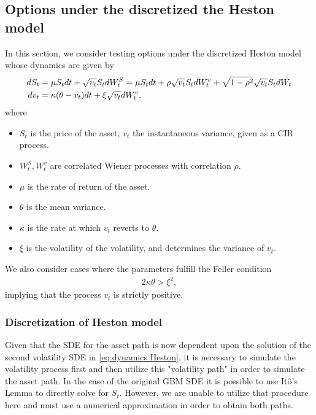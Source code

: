 \subsection{Options under the discretized the Heston model}
In this section, we consider  testing options under the discretized Heston model \cite{heston1993closed,broadie2006exact,kahl2006fast,andersen2007efficient} whose dynamics are given by
\begin{align}\label{eq:dynamics Heston}
dS_t&=\mu S_t dt+\sqrt{v_t}S_t dW_t^S= \mu S_t dt+ \rho\sqrt{v_t}S_t dW_t^v+ \sqrt{1-\rho^2} \sqrt{v_t}S_t dW_t \nonumber\\
dv_t&=\kappa (\theta-v_t)dt+\xi \sqrt{v_t} dW_t^v,
\end{align}
where 

\begin{itemize}
\item $S_t$ is the price of the asset, $v_t$ the instantaneous variance, given as  a CIR process.
\item $W_{t}^{S},W_{t}^{v}$ are correlated Wiener processes with correlation $\rho$.
\item $\mu$  is the rate of return of the asset.
\item $\theta$ is  the mean  variance.
\item $\kappa$ is the rate at which $v_t$ reverts to $\theta$.
\item $\xi$ is the volatility of the volatility, and determines the variance of $v_t$.
\end{itemize}
We also consider cases where the parameters fulfill the Feller condition
\begin{align*}
2 \kappa \theta >\xi^2,
\end{align*}
implying  that the process $v_t$ is strictly positive.

\subsubsection{Discretization of Heston model}
Given that the SDE for the asset path is now dependent  upon the solution of the second volatility SDE in \eqref{eq:dynamics Heston}, it is necessary to simulate the volatility process first and then utilize this "volatility path" in order to simulate the asset path. In the case of the original GBM SDE it is possible to use It\^o's Lemma to directly solve for $S_t$. However, we are unable to utilize that procedure here and must use a numerical approximation in order to obtain both paths. 

